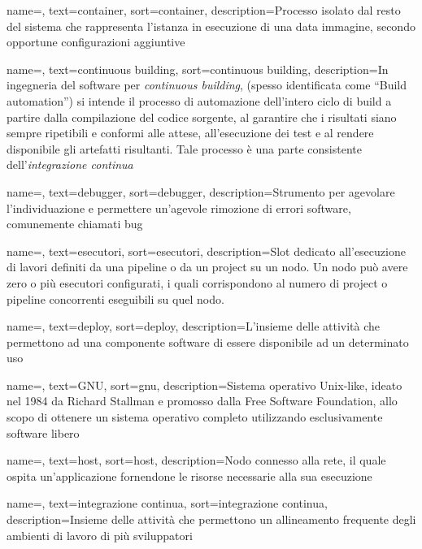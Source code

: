 {
    name=,
    text=container,
    sort=container,
    description={Processo isolato dal resto del sistema che rappresenta l'istanza in esecuzione di una data immagine, secondo opportune configurazioni aggiuntive}
}

{
    name=,
    text=continuous building,
    sort=continuous building,
    description={In ingegneria del software per \emph{continuous building}, (spesso identificata come ``Build automation'') si intende il processo di automazione dell'intero ciclo di build a partire dalla compilazione del codice sorgente, al garantire che i risultati siano sempre ripetibili e conformi alle attese, all'esecuzione dei test e al rendere disponibile gli artefatti risultanti. Tale processo è una parte consistente dell'\textit{integrazione continua}}
}

{
    name=,
    text=debugger,
    sort=debugger,
    description={Strumento per agevolare l'individuazione e permettere un'agevole rimozione di errori software, comunemente chiamati bug}
}

{
    name=,
    text=esecutori,
    sort=esecutori,
    description={Slot dedicato all'esecuzione di lavori definiti da una pipeline o da un project su un nodo. Un nodo può avere zero o più esecutori configurati, i quali corrispondono al numero di project o pipeline concorrenti eseguibili su quel nodo.}
}

{
    name=,
    text=deploy,
    sort=deploy,
    description={L'insieme delle attività che permettono ad una componente software di essere disponibile ad un determinato uso}
}

{
    name=,
    text=GNU,
    sort=gnu,
    description={Sistema operativo Unix-like, ideato nel 1984 da Richard Stallman e promosso dalla Free Software Foundation, allo scopo di ottenere un sistema operativo completo utilizzando esclusivamente software libero}
}

{
    name=,
    text=host,
    sort=host,
    description={Nodo connesso alla rete, il quale ospita un'applicazione fornendone le risorse necessarie alla sua esecuzione}
}

{
    name=,
    text=integrazione continua,
    sort=integrazione continua,
    description={Insieme delle attività che permettono un allineamento frequente degli ambienti di lavoro di più sviluppatori}
}


